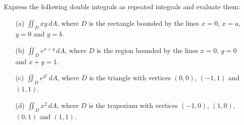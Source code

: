 \documentclass[a4paper]{amsart}
\begin{document}
\begin{exercise}
 Express the following double integrals as repeated integrals and
 evaluate them: 
 \begin{itemize}
  \item[(a)] $\iint_D xy\,dA$, where $D$ is the rectangle bounded by
   the lines $x=0$, $x=a$, $y=0$ and $y=b$.
  \item[(b)] $\iint_D e^{x+y}\,dA$, where $D$ is the region bounded by
   the lines $x=0$, $y=0$ and $x+y=1$.
  \item[(c)] $\iint_D e^{y^2}\,dA$, where $D$ is the triangle with
   vertices $(0,0)$, $(-1,1)$ and $(1,1)$.
  \item[(d)] $\iint_D x^2\,dA$, where $D$ is the trapezium with
   vertices $(-1,0)$, $(1,0)$, $(0,1)$ and $(1,1)$.
 \end{itemize}
\end{exercise}
\end{document}

